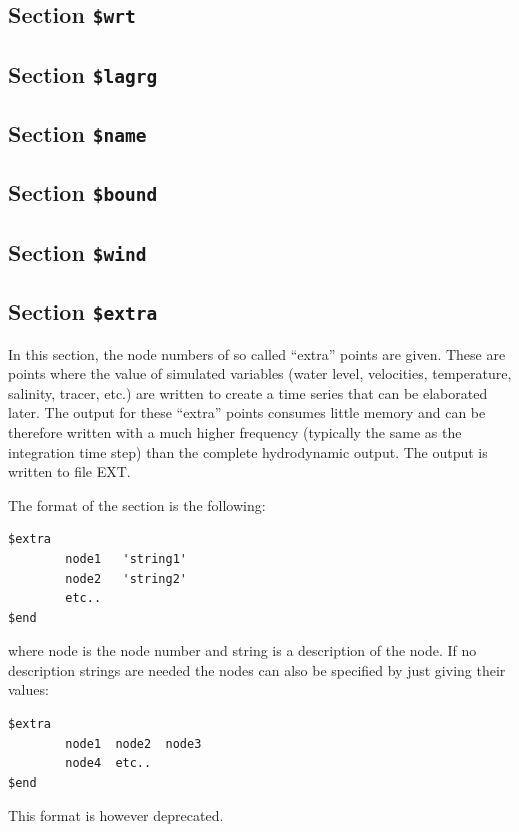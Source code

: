%

\subsection{Section {\tt \$wrt}}


\subsection{Section {\tt \$lagrg}}


\subsection{Section {\tt \$name}}


\subsection{Section {\tt \$bound}}


\subsection{Section {\tt \$wind}}


\subsection{Section {\tt \$extra}}

In this section, the node numbers of so called ``extra'' points are given.
These are points where the value of simulated variables (water level,
velocities, temperature, salinity, tracer, etc.) are written to create
a time series that can be elaborated later. The output for these ``extra''
points consumes little memory and can be therefore written with a
much higher frequency (typically the same as the integration time step)
than the complete hydrodynamic output. The output is written
to file EXT.

The format of the section is the following:
\begin{verbatim}
$extra
        node1   'string1'
        node2   'string2'
        etc..
$end
\end{verbatim}
where node is the node number and string is a description of the node.
If no description strings are needed the nodes can also be specified
by just giving their values:
\begin{verbatim}
$extra
        node1  node2  node3
        node4  etc..
$end
\end{verbatim}
This format is however deprecated.


